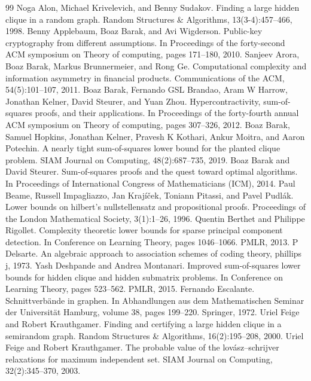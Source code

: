 \begin{thebibliography}{99}
 Noga Alon, Michael Krivelevich, and Benny Sudakov. Finding a large hidden clique in a random graph. Random Structures \& Algorithms, 13(3-4):457–466, 1998.
 Benny Applebaum, Boaz Barak, and Avi Wigderson. Public-key cryptography from different assumptions. In Proceedings of the forty-second ACM symposium on Theory of computing, pages 171–180, 2010.
 Sanjeev Arora, Boaz Barak, Markus Brunnermeier, and Rong Ge. Computational complexity and information asymmetry in financial products. Communications of the ACM, 54(5):101–107, 2011.
 Boaz Barak, Fernando GSL Brandao, Aram W Harrow, Jonathan Kelner, David Steurer, and Yuan Zhou. Hypercontractivity, sum-of-squares proofs, and their applications. In Proceedings of the forty-fourth annual ACM symposium on Theory of computing, pages 307–326, 2012.
 Boaz Barak, Samuel Hopkins, Jonathan Kelner, Pravesh K Kothari, Ankur Moitra, and Aaron Potechin. A nearly tight sum-of-squares lower bound for the planted clique problem. SIAM Journal on Computing, 48(2):687–735, 2019.
 Boaz Barak and David Steurer. Sum-of-squares proofs and the quest toward optimal algorithms. In Proceedings of International Congress of Mathematicians (ICM), 2014.
 Paul Beame, Russell Impagliazzo, Jan Krajíček, Toniann Pitassi, and Pavel Pudlák. Lower bounds on hilbert’s nullstellensatz and propositional proofs. Proceedings of the London Mathematical Society, 3(1):1–26, 1996.
 Quentin Berthet and Philippe Rigollet. Complexity theoretic lower bounds for sparse principal component detection. In Conference on Learning Theory, pages 1046–1066. PMLR, 2013.
 P Delsarte. An algebraic approach to association schemes of coding theory, phillips j, 1973.
 Yash Deshpande and Andrea Montanari. Improved sum-of-squares lower bounds for hidden clique and hidden submatrix problems. In Conference on Learning Theory, pages 523–562. PMLR, 2015.
 Fernando Escalante. Schnittverbände in graphen. In Abhandlungen aus dem Mathematischen Seminar der Universität Hamburg, volume 38, pages 199–220. Springer, 1972.
 Uriel Feige and Robert Krauthgamer. Finding and certifying a large hidden clique in a semirandom graph. Random Structures \& Algorithms, 16(2):195–208, 2000.
 Uriel Feige and Robert Krauthgamer. The probable value of the lovász–schrijver relaxations for maximum independent set. SIAM Journal on Computing, 32(2):345–370, 2003.

\end{thebibliography}
